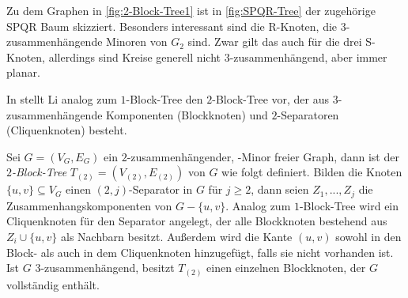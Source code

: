 Zu dem Graphen in \Abb \ref{fig:2-Block-Tree1} ist in \Abb \ref{fig:SPQR-Tree} der zugehörige SPQR Baum skizziert.
Besonders interessant sind die R-Knoten, die $3$-zusammenhängende Minoren von $G_2$ sind.
Zwar gilt das auch für die drei S-Knoten, allerdings sind Kreise generell nicht $3$-zusammenhängend, aber immer planar.

In \cite{Li11} stellt Li analog zum $1$-Block-Tree den $2$-Block-Tree vor, der aus $3$-zusammenhängende Komponenten (Blockknoten) und $2$-Separatoren (Cliquenknoten) besteht.

\begin{definition}
  Sei $G = (V_G, E_G)$ ein $2$-zusammenhängender, \kf-Minor freier Graph, dann ist der \emph{$2$-Block-Tree} $T_{(2)} = (V_{(2)}, E_{(2)})$ von $G$ wie folgt definiert.
  Bilden die Knoten $\{u, v\} \subseteq V_G$ einen $(2, j)$-Separator in $G$ für $j \geq 2$, dann seien $Z_1, ..., Z_j$ die Zusammenhangskomponenten von $G - \{u, v\}$.
  Analog zum $1$-Block-Tree wird ein Cliquenknoten für den Separator angelegt, der alle Blockknoten bestehend aus $Z_i \cup \{u, v\}$ als Nachbarn besitzt.
  Außerdem wird die Kante $(u, v)$ sowohl in den Block- als auch in dem Cliquenknoten hinzugefügt, falls sie nicht vorhanden ist.
  Ist $G$ $3$-zusammenhängend, besitzt $T_{(2)}$ einen einzelnen Blockknoten, der $G$ vollständig enthält.
\end{definition}

